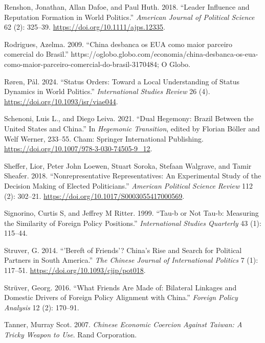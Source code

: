 \documentclass[
  12pt,
]{article}
\newlength{\cslhangindent}
\newenvironment{CSLReferences}[2] %
 {\begin{list}{}{%
  \setlength{\itemindent}{0pt}
  \setlength{\leftmargin}{0pt}
  \setlength{\parsep}{0pt}
  \ifodd #1
   \setlength{\leftmargin}{\cslhangindent}
   \setlength{\itemindent}{-1\cslhangindent}
  \fi
  \setlength{\itemsep}{#2\baselineskip}}}
 {\end{list}}
\begin{document}
\begin{CSLReferences}{1}{0}
Renshon, Jonathan, Allan Dafoe, and Paul Huth. 2018. {``Leader
{Influence} and {Reputation Formation} in {World Politics}.''}
\emph{American Journal of Political Science} 62 (2): 325--39.
\url{https://doi.org/10.1111/ajps.12335}.

Rodrigues, Azelma. 2009. {``{China desbanca os EUA como maior parceiro
comercial do Brasil}.''}
https://oglobo.globo.com/economia/china-desbanca-os-eua-como-maior-parceiro-comercial-do-brasil-3170484;
O Globo.

Røren, Pål. 2024. {``Status {Orders}: {Toward} a {Local Understanding}
of {Status Dynamics} in {World Politics}.''} \emph{International Studies
Review} 26 (4). \url{https://doi.org/10.1093/isr/viae044}.

Schenoni, Luis L., and Diego Leiva. 2021. {``Dual {Hegemony}: {Brazil
Between} the {United States} and {China}.''} In \emph{Hegemonic
{Transition}}, edited by Florian Böller and Welf Werner, 233--55. Cham:
Springer International Publishing.
\url{https://doi.org/10.1007/978-3-030-74505-9_12}.

Sheffer, Lior, Peter John Loewen, Stuart Soroka, Stefaan Walgrave, and
Tamir Sheafer. 2018. {``Nonrepresentative {Representatives}: {An
Experimental Study} of the {Decision Making} of {Elected
Politicians}.''} \emph{American Political Science Review} 112 (2):
302--21. \url{https://doi.org/10.1017/S0003055417000569}.

Signorino, Curtis S, and Jeffrey M Ritter. 1999. {``Tau-b or Not Tau-b:
{Measuring} the Similarity of Foreign Policy Positions.''}
\emph{International Studies Quarterly} 43 (1): 115--44.

Struver, G. 2014. {``'{Bereft} of {Friends}'? {China}'s {Rise} and
{Search} for {Political Partners} in {South America}.''} \emph{The
Chinese Journal of International Politics} 7 (1): 117--51.
\url{https://doi.org/10.1093/cjip/pot018}.

Strüver, Georg. 2016. {``What Friends Are Made of: {Bilateral} Linkages
and Domestic Drivers of Foreign Policy Alignment with {China}.''}
\emph{Foreign Policy Analysis} 12 (2): 170--91.

Tanner, Murray Scot. 2007. \emph{Chinese Economic Coercion Against
{Taiwan}: {A} Tricky Weapon to Use}. Rand Corporation.


\end{CSLReferences}
\end{document}
